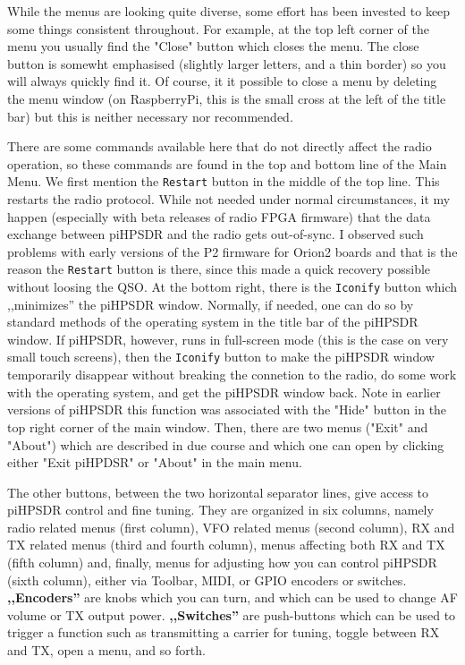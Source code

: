 \documentclass[12pt]{book}
\begin{document}
While the menus are looking quite diverse, some effort has been invested to keep
some things consistent throughout. For example, at the top left corner of the menu
you usually find the "Close" button which closes the menu. The close button is somewht
emphasised (slightly larger letters, and a thin border) so you will always quickly find it.
Of course, it it possible to close a menu by deleting the menu window (on RaspberryPi,
this is the small cross at the left of the title bar) but this is neither necessary nor
recommended.

There are some commands available here that do not directly affect the radio operation,
so these commands are found in the top and bottom line of the Main Menu. We first 
mention the \texttt{Restart} button in the middle of the top line. This restarts the
radio protocol. While not needed under normal circumstances, it my happen (especially
with beta releases of radio FPGA firmware) that the data exchange between piHPSDR and
the radio gets out-of-sync. I observed such problems with early versions of the P2
firmware for Orion2 boards and that is the reason the \texttt{Restart} button is
there, since this made a quick recovery possible without loosing the QSO.
At the bottom right, there is the \texttt{Iconify} button which ,,minimizes'' the
piHPSDR window. Normally, if needed, one can do so by standard methods of the
operating system in the title bar of the piHPSDR window. If piHPSDR, however,
runs in full-screen mode (this is the case on very small touch screens), then the
\texttt{Iconify} button to make the piHPSDR window temporarily disappear without
breaking the connetion to the radio, do some work with the operating system, and
get the piHPSDR window back. Note in earlier versions of piHPSDR this function was
associated with the "Hide" button in the top right corner of the main window.
Then, there are two menus ("Exit" and "About") which are described in due course and which
one can open by clicking either "Exit piHPDSR" or "About" in the main menu.

The other buttons, between the two horizontal separator lines, give access to piHPSDR
control and fine tuning. They are organized in six columns, namely radio related
menus (first column), VFO related menus (second column), RX and TX related menus (third
and fourth column), menus affecting both RX and TX (fifth column) and, finally,
menus for adjusting how you can control piHPSDR (sixth column), either via Toolbar,
MIDI, or GPIO encoders or switches. \textbf{,,Encoders''} are knobs which you can turn, and which
can be used to change AF volume or TX output power. \textbf{,,Switches''} are push-buttons which
can be used to trigger a function such as transmitting a carrier for tuning, toggle
between RX and TX, open a menu, and so forth.
\end{document}
